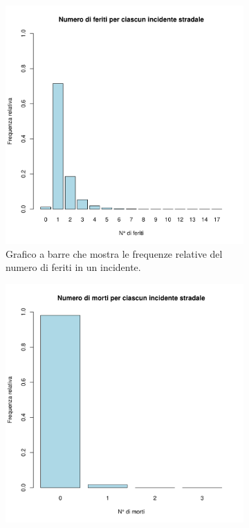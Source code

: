 \documentclass[12pt,a4paper,final,oneside]{article}			%
\begin{document}
        \begin{figure}[h!]
            \begin{subfigure}{0.48\textwidth}
                \centering
                \includegraphics[scale=0.4]{../results/numero_feriti_per_incidente.pdf}
                \caption{Grafico a barre che mostra le frequenze relative del numero di feriti in un incidente.}
                \label{Fig: numero_morti_per_incidente}
            \end{subfigure}
            \hfill
            \begin{subfigure}{0.48\textwidth}
                \centering
                \includegraphics[scale=0.4]{../results/numero_morti_per_incidente.pdf}

\end{subfigure}
\end{figure}
\end{document}
